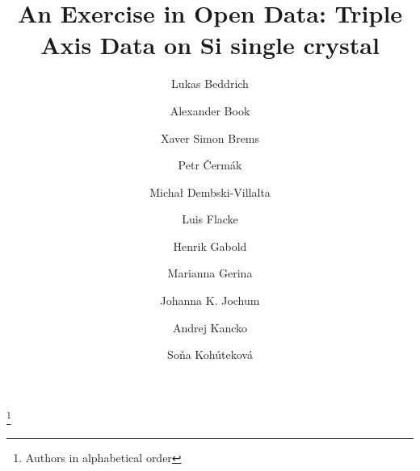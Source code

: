 \documentclass[aps,reprint,amsmath,amssymb,superscriptaddress]{revtex4-1}
\begin{document}

\title{An Exercise in Open Data: Triple Axis Data on Si single crystal}%
\thanks{Authors in alphabetical order}%

\author{Lukas Beddrich}
\address{Heinz Maier-Leibnitz Zentrum (MLZ), Technische Universit\"at M\"unchen, D-85748 Garching, Germany}
\address{Technische Universit\"at M\"unchen, Physik-Department, Lehrstuhl f\"ur Neutronenstreuung (E21), D-85748 Garching, Germany}

\author{Alexander Book}
\address{Technische Universit\"at M\"unchen, Physik-Department, Lehrstuhl f\"ur Neutronenstreuung (E21), D-85748 Garching, Germany}

\author{Xaver Simon Brems}
\address{Heinz Maier-Leibnitz Zentrum (MLZ), Technische Universit\"at M\"unchen, D-85748 Garching, Germany}

\author{Petr \v{C}erm\'{a}k}
\address{Charles University, Faculty of Mathematics and Physics, Department of Condensed Matter Physics}

\author{Micha{\l} Dembski-Villalta}
\address{Technische Universit\"at M\"unchen, D-85748 Garching, Germany}

\author{Luis Flacke}
\address{Walther Meißner Institut, Bayerische Akademie der Wissenschaften, D-85748 Garching, Germany}
\address{Technische Universit\"at M\"unchen, D-85748 Garching, Germany}

\author{Henrik Gabold}
\address{Technische Universit\"at M\"unchen, Physik-Department, Lehrstuhl f\"ur Neutronenstreuung (E21), D-85748 Garching, Germany}

\author{Marianna Gerina}
\address{Charles University, Faculty of Mathematics and Physics, Department of Condensed Matter Physics}

\author{Johanna K. Jochum}
\address{Heinz Maier-Leibnitz Zentrum (MLZ), Technische Universit\"at M\"unchen, D-85748 Garching, Germany}

\author{Andrej Kancko}
\address{Charles University, Faculty of Mathematics and Physics, Department of Condensed Matter Physics}

\author{Soňa Koh\'{u}tekov\'{a}}
\address{Charles University, Faculty of Science, Department of Inorganic Chemistry, Prague}
\end{document}
